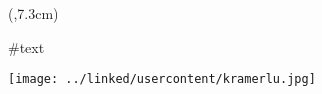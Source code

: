 \begin{textblock*}{\textwidth}(\rborder,7.3cm)
\begin{multicols}{2}
#text
\end{multicols}
\begin{center}
\noindent\texttt{[image: ../linked/usercontent/kramerlu.jpg]}
\end{center}
\end{textblock*}
\vspace*{15cm}
